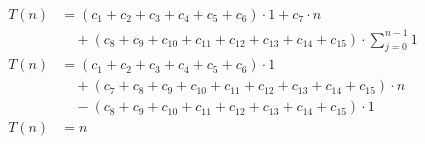 \begin{subequations}
\label{eq:findlinesegments-startendy}
\begin{align}
\label{eq:findlinesegments4}
T(n)& = (c_{1} + c_{2} + c_{3} + c_{4} + c_{5} + c_{6}) \cdot 1 + c_{7} \cdot n\\
& \quad + (c_{8} + c_{9} + c_{10} + c_{11} + c_{12} + c_{13} + c_{14} + c_{15}) \cdot \sum_{j=0}^{n-1} 1 \nonumber \\
\label{eq:findlinesegments5}
T(n)& = (c_{1} + c_{2} + c_{3} + c_{4} + c_{5} + c_{6}) \cdot 1 \\
& \quad + (c_{7} + c_{8} + c_{9} + c_{10} + c_{11} + c_{12} + c_{13} + c_{14} + c_{15}) \cdot n \nonumber \\
& \quad - (c_{8} + c_{9} + c_{10} + c_{11} + c_{12} + c_{13} + c_{14} + c_{15}) \cdot 1 \nonumber \\
\label{eq:findlinesegments6}
T(n)& = n
\end{align}
\end{subequations}
